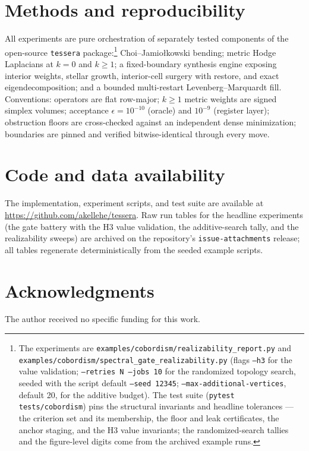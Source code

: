 \documentclass[a4paper,twocolumn,11pt,unpublished]{quantumarticle}
\theoremstyle{plain}
\theoremstyle{remark}
\begin{document}
\section{Methods and reproducibility}
\label{sec:methods}

All experiments are pure orchestration of separately tested components of
the open-source \texttt{tessera} package:\footnote{The experiments are
\texttt{examples/cobordism/realizability\_report.py} and
\texttt{examples/cobordism/spectral\_gate\_realizability.py} (flags
\texttt{--h3} for the value validation; \texttt{--retries N --jobs 10}
for the randomized topology search, seeded with the script default
\texttt{--seed 12345}; \texttt{--max-additional-vertices}, default 20,
for the additive budget). The test suite (\texttt{pytest tests/cobordism})
pins the structural invariants and headline tolerances --- the criterion
set and its membership, the floor and leak certificates, the anchor
staging, and the H3 value invariants; the randomized-search tallies and
the figure-level digits come from the archived example runs.}
Choi--Jamio{\l}kowski bending; metric Hodge Laplacians at $k=0$ and
$k\ge1$; a fixed-boundary synthesis engine exposing interior weights,
stellar growth, interior-cell surgery with restore, and exact
eigendecomposition; and a bounded multi-restart Levenberg--Marquardt
fill. Conventions: operators are flat row-major; $k\ge1$ metric weights
are signed simplex volumes; acceptance $\epsilon=10^{-10}$ (oracle) and
$10^{-9}$ (register layer); obstruction floors are cross-checked against
an independent dense minimization; boundaries are pinned and verified
bitwise-identical through every move.

\section*{Code and data availability}
The implementation, experiment scripts, and test suite are available at
\url{https://github.com/akellehe/tessera}. Raw run tables for the
headline experiments (the gate battery with the H3 value validation, the
additive-search tally, and the realizability sweeps) are archived on the
repository's \texttt{issue-attachments} release; all tables regenerate
deterministically from the seeded example scripts.

\section*{Acknowledgments}
The author received no specific funding for this work.



\end{document}
